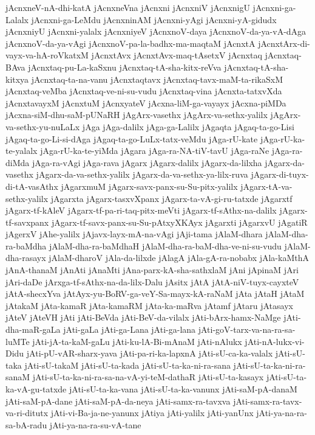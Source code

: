 {jAcnxneV-nA-dhi-katA
jAcnxneVna
jAcnxni
jAcnxniV
jAcnxnigU
jAcnxni-ga-Lalalx
jAcnxni-ga-LeMdu
jAcnxninAM
jAcnxni-yAgi
jAcnxni-yA-gidudx
jAcnxniyU
jAcnxni-yalalx
jAcnxniyeV
jAcnxnoV-daya
jAcnxnoV-da-ya-vA-dAga
jAcnxnoV-da-ya-vAgi
jAcnxnoV-pa-la-badhx-ma-maqtaM
jAcnxtA
jAcnxtArx-di-vayx-va-hA-roVkatxM
jAcnxtAvx
jAcnxtAvx-maq-tAsetxV
jAcnxtaq
jAcnxtaq-BAva
jAcnxtaq-pu-La-kaSxnu
jAcnxtaq-tA-sha-kitx-reVva
jAcnxtaq-tA-sha-kitxya
jAcnxtaq-ta-na-vanu
jAcnxtaqtavx
jAcnxtaq-tavx-maM-ta-rikaSxM
jAcnxtaq-veMba
jAcnxtaq-ve-ni-su-vudu
jAcnxtaq-vina
jAcnxta-tatxvXda
jAcnxtavayxM
jAcnxtuM
jAcnxyateV
jAcxna-liM-ga-vayayx
jAcxna-piMDa
jAcxna-siM-dhu-saM-pUNaRH
jAgArx-vasethx
jAgArx-va-sethx-yalilx
jAgArx-va-sethx-yu-nuLaLx
jAga
jAga-dalilx
jAga-ga-Lalilx
jAgaqta
jAgaq-ta-go-Lisi
jAgaq-ta-go-Li-si-dAga
jAgaq-ta-go-LuLx-tatx-veMdu
jAga-rU-kate
jAga-rU-ka-te-yalalx
jAga-rU-ka-te-yiMda
jAgara
jAga-ra-NA-tiV-tavU
jAga-raNe
jAga-ra-diMda
jAga-ra-vAgi
jAga-rava
jAgarx
jAgarx-dalilx
jAgarx-da-lilxha
jAgarx-da-vasethx
jAgarx-da-va-sethx-yalilx
jAgarx-da-va-sethx-ya-lilx-ruva
jAgarx-di-tuyx-di-tA-vasAthx
jAgarxmuM
jAgarx-savx-panx-su-Su-pitx-yalilx
jAgarx-tA-va-sethx-yalilx
jAgarxta
jAgarx-tasxvXpanx
jAgarx-ta-vA-gi-ru-tatxde
jAgarxtf
jAgarx-tf-kAleV
jAgarx-tf-pa-ri-taq-pitx-meVti
jAgarx-tf-sAthx-na-dalilx
jAgarx-tf-savxpanx
jAgarx-tf-savx-panx-su-Su-pAtxyXKAyx
jAgarxti
jAgarxvU
jAgatiR
jAgerxV
jAhe-yalilx
jAjavx-layx-mA-na-vAgi
jAji-tama
jAlaM-dhara
jAlaM-dha-ra-baMdha
jAlaM-dha-ra-baMdhaH
jAlaM-dha-ra-baM-dha-ve-ni-su-vudu
jAlaM-dha-rasayx
jAlaM-dharoV
jAla-da-lilxde
jAlagA
jAla-gA-ra-nobabx
jAla-kaMthA
jAnA-thanaM
jAnAti
jAnaMti
jAna-parx-kA-sha-sathxlaM
jAni
jApinaM
jAri
jAri-daDe
jArxga-tf-sAthx-na-da-lilx-Dalu
jAsitx
jAtA
jAtA-niV-tuyx-cayxteV
jAtA-shecxYva
jAtAyx-yu-BoRV-ga-veY-Sa-mayx-kA-raNaM
jAta
jAtaH
jAtaM
jAtakaM
jAta-kamaR
jAta-kamaRM
jAta-ka-maRva
jAtamf
jAtaru
jAtasayx
jAteV
jAteVH
jAti
jAti-BeVda
jAti-BeV-da-vilalx
jAti-bArx-hamx-NaMge
jAti-dha-maR-gaLa
jAti-gaLa
jAti-ga-Lana
jAti-ga-lana
jAti-goV-tarx-va-na-ra-sa-luMTe
jAti-jA-ta-kaM-gaLu
jAti-ku-lA-Bi-mAnaM
jAti-nAlukx
jAti-nA-lukx-vi-Didu
jAti-pU-vAR-sharx-yava
jAti-pa-ri-ka-lapxnA
jAti-sU-ca-ka-valalx
jAti-sU-taka
jAti-sU-takaM
jAti-sU-ta-kada
jAti-sU-ta-ka-ni-ra-sana
jAti-sU-ta-ka-ni-ra-sanaM
jAti-sU-ta-ka-ni-ra-sa-na-vA-yi-teM-dathaR
jAti-sU-ta-kasayx
jAti-sU-ta-ka-vA-gu-tatxde
jAti-sU-ta-ka-vana
jAti-sU-ta-ka-vanunx
jAti-saM-pA-danaM
jAti-saM-pA-dane
jAti-saM-pA-da-neya
jAti-samx-ra-tavxva
jAti-samx-ra-tavx-va-ri-ditutx
jAti-vi-Ba-ja-ne-yanunx
jAtiya
jAti-yalilx
jAti-yanUnx
jAti-ya-na-ra-sa-bA-radu
jAti-ya-na-ra-su-vA-tane
}
